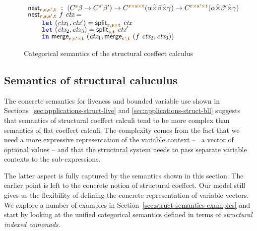 \begin{figure*}[!t]
\begin{equation*}
\begin{array}{l}
\ident{nest}_{\aclrd{\textbf{r}}, \aclrd{\textbf{s}}, \aclrd{\textbf{s'}}, \aclrd{\textbf{t}}} ~:~
  (\ctyp{\aclrd{\textbf{s}}}{\beta} \rightarrow \ctyp{\aclrd{\textbf{s'}}}{\beta'}) \rightarrow
    \ctyp{\aclrd{\textbf{r}} \atimes \aclrd{\textbf{s}} \atimes \aclrd{\textbf{t}}}{(\alpha \xtimes \beta \xtimes \gamma)} \rightarrow
    \ctyp{\aclrd{\textbf{r}} \atimes \aclrd{\textbf{s'}} \atimes \aclrd{\textbf{t}}}{(\alpha \xtimes \beta' \xtimes \gamma)}\\[-0.25em]
\ident{nest}_{\aclrd{\textbf{r}}, \aclrd{\textbf{s}}, \aclrd{\textbf{s'}}, \aclrd{\textbf{t}}}~f~\ctx =\\
  \hspace{2em} \kvd{let}~(\ctx_1, \ctx') = \ident{split}_{\aclrd{\textbf{r}}, \aclrd{\textbf{s}}\atimes\aclrd{\textbf{t}}}~\ctx \\[-0.25em]
  \hspace{2em} \kvd{let}~(\ctx_2, \ctx_3) = \ident{split}_{\aclrd{\textbf{s}}, \aclrd{\textbf{t}}}~\ctx' \\[-0.25em] 
  \hspace{2em} \kvd{in}~\ident{merge}_{\aclrd{\textbf{r}}, \aclrd{\textbf{s'}}\atimes\aclrd{\textbf{t}}}~
        (\ctx_1, \ident{merge}_{\aclrd{\textbf{s'}}, \aclrd{\textbf{t}}}~(f~\ctx_2, \ctx_3))
\end{array}
\end{equation*}
\caption{Categorical semantics of the structural coeffect calculus}
\label{fig:struct-semantics}
\end{figure*}


\subsection{Semantics of structural caluculus}

The concrete semantics for liveness and bounded variable use shown in 
Sections~\ref{sec:applications-struct-live} and \ref{sec:applications-struct-bll}
suggests that semantics of structural coeffect calculi tend to be more complex 
than semantics of flat coeffect calculi. The complexity comes from the fact
that we need a more expressive representation of the variable context -- \eg~a vector
of optional values -- and that the structural system needs to pass separate variable contexts
to the sub-expressions.

The latter aspect is fully captured by the semantics shown in this section. The
earlier point is left to the concrete notion of structural coeffect. Our model still gives
us the flexibility of defining the concrete representation of variable vectors. We explore
a number of examples in Section~\ref{sec:struct-semantics-examples} and start by looking
at the unified categorical semantics defined in terms of \emph{structural indexed comonads}.

